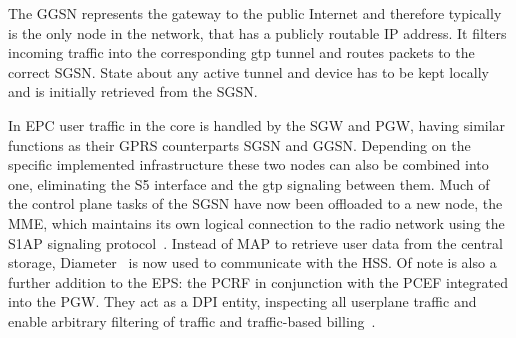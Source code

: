 The \gls{GGSN} represents the gateway to the public Internet and therefore typically is the only node in the network, that has a publicly routable \gls{IP} address. It filters incoming traffic into the corresponding \gls{gtp} tunnel and routes packets to the correct \gls{SGSN}. State about any active tunnel and device has to be kept locally and is initially retrieved from the \gls{SGSN}.

In \gls{EPC} user traffic in the core is handled by the \gls{SGW} and \gls{PGW}, having similar functions as their \gls{GPRS} counterparts \gls{SGSN} and \gls{GGSN}. Depending on the specific implemented infrastructure these two nodes can also be combined into one, eliminating the S5 interface and the \gls{gtp} signaling between them. Much of the control plane tasks of the \gls{SGSN} have now been offloaded to a new node, the \gls{MME}, which maintains its own logical connection to the radio network using the \gls{S1AP} signaling protocol~\cite{3gpp.36.413}. Instead of \gls{MAP} to retrieve user data from the central storage, Diameter~\cite{rfc6733} is now used to communicate with the \gls{HSS}. Of note is also a further addition to the \gls{EPS}: the \gls{PCRF} in conjunction with the \gls{PCEF} integrated into the \gls{PGW}. They act as a \gls{DPI} entity, inspecting all userplane traffic and enable arbitrary filtering of traffic and traffic-based billing~\cite{3gpp.23.203}. 


